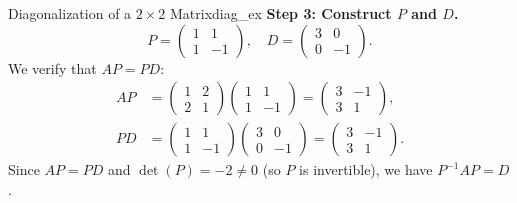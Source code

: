 \documentclass[10pt, letterpaper]{article}
\begin{document}
\begin{example}{Diagonalization of a $2 \times 2$ Matrix}{diag_ex}
    \textbf{Step 3: Construct $P$ and $D$.}
    \begin{equation*}
        P = \begin{pmatrix} 1 & 1 \\ 1 & -1 \end{pmatrix}, \quad D = \begin{pmatrix} 3 & 0 \\ 0 & -1 \end{pmatrix}.
    \end{equation*}
    We verify that $AP = PD$:
    \begin{align*}
        AP &= \begin{pmatrix} 1 & 2 \\ 2 & 1 \end{pmatrix}\begin{pmatrix} 1 & 1 \\ 1 & -1 \end{pmatrix} = \begin{pmatrix} 3 & -1 \\ 3 & 1 \end{pmatrix}, \\
        PD &= \begin{pmatrix} 1 & 1 \\ 1 & -1 \end{pmatrix}\begin{pmatrix} 3 & 0 \\ 0 & -1 \end{pmatrix} = \begin{pmatrix} 3 & -1 \\ 3 & 1 \end{pmatrix}.
    \end{align*}
    Since $AP = PD$ and $\det(P) = -2 \neq 0$ (so $P$ is invertible), we have $P^{-1} A P = D$.
\end{example}
\end{document}
